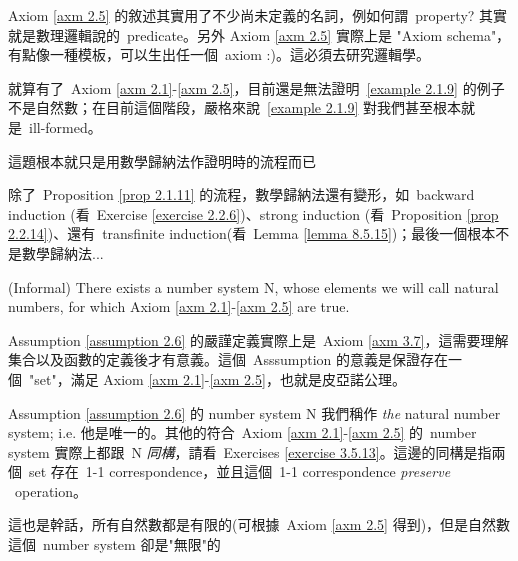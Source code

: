 \begin{remark}\label{rmk 2.1.10} Axiom \ref{axm 2.5} 的敘述其實用了不少尚未定義的名詞，例如何謂\ property? 其實就是數理邏輯說的\ predicate。另外 Axiom \ref{axm 2.5} 實際上是 "Axiom schema"，有點像一種模板，可以生出任一個\  axiom :)。這必須去研究邏輯學。
\end{remark}

\begin{note}
就算有了\ Axiom \ref{axm 2.1}-\ref{axm 2.5}，目前還是無法證明\  \ref{example 2.1.9} 的例子不是自然數；在目前這個階段，嚴格來說\ \ref{example 2.1.9} 對我們甚至根本就是\ ill-formed。
\end{note}

\begin{proposition}\label{prop 2.1.11}
這題根本就只是用數學歸納法作證明時的流程而已
\end{proposition}

\begin{note}
除了\ Proposition \ref{prop 2.1.11} 的流程，數學歸納法還有變形，如\ backward induction (看\ Exercise \ref{exercise 2.2.6})、strong induction (看\ Proposition \ref{prop 2.2.14})、還有\ transfinite induction(看\ Lemma \ref{lemma 8.5.15})；最後一個根本不是數學歸納法...
\end{note}

\begin{assumption}\label{assumption 2.6} (Informal)
There exists a number system N, whose elements we will call natural numbers, for which Axiom \ref{axm 2.1}-\ref{axm 2.5} are true.
\end{assumption}
\begin{note}
Assumption \ref{assumption 2.6} 的嚴謹定義實際上是\ Axiom \ref{axm 3.7}，這需要理解集合以及函數的定義後才有意義。這個\ Asssumption 的意義是保證存在一個\ "set"，滿足 Axiom \ref{axm 2.1}-\ref{axm 2.5}，也就是皮亞諾公理。
\end{note}

\begin{remark}\label{remark 2.1.12} Assumption \ref{assumption 2.6} 的 number system N 我們稱作 \emph{the} natural number system; i.e. 他是唯一的。其他的符合\ Axiom \ref{axm 2.1}-\ref{axm 2.5} 的\ number system 實際上都跟\ N \emph{同構}，請看\ Exercises \ref{exercise 3.5.13}。這邊的同構是指兩個\ set 存在\ 1-1 correspondence，並且這個\ 1-1 correspondence \emph{preserve} \INC\ operation。
\end{remark}

\begin{remark}\label{remark 2.1.13}
這也是幹話，所有自然數都是有限的(可根據\ Axiom \ref{axm 2.5} 得到)，但是自然數這個\ number system 卻是"無限"的
\end{remark}

